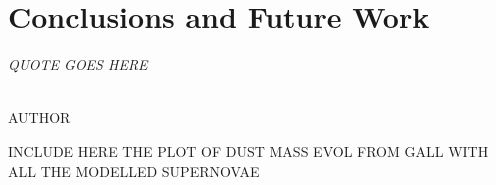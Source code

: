 \chapter{Conclusions and Future Work}\label{chp:chp7}

\begin{flushright}
  {\em QUOTE GOES HERE }\\

\ \

\normalsize
{AUTHOR}  
\end{flushright}



INCLUDE HERE THE PLOT OF DUST MASS EVOL FROM GALL WITH ALL THE MODELLED SUPERNOVAE


